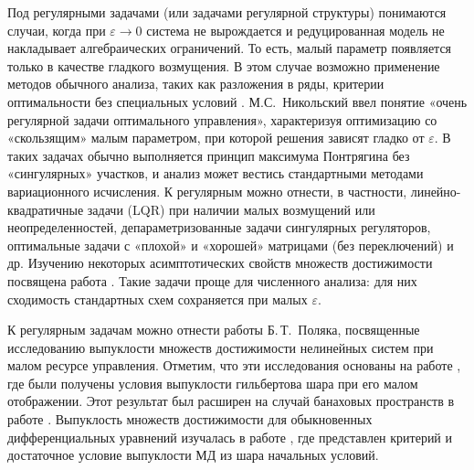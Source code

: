\documentclass[../main.tex]{subfiles}
\begin{document}
Под регулярными задачами (или задачами регулярной структуры) понимаются случаи, когда при $\varepsilon\to0$ система не вырождается и редуцированная модель не накладывает алгебраических ограничений. 
То есть, малый параметр появляется только в качестве гладкого возмущения. 
В этом случае возможно применение методов обычного анализа, таких как разложения в ряды, критерии оптимальности без специальных условий \cite{Haratishvili}. 
М.С. Никольский \cite{Nikolski} ввел понятие «очень регулярной задачи оптимального управления», характеризуя оптимизацию со «скользящим» малым параметром, при которой решения зависят гладко от $\varepsilon$. 
В таких задачах обычно выполняется принцип максимума Понтрягина без «сингулярных» участков, и анализ может вестись стандартными методами вариационного исчисления. 
К регулярным можно отнести, в частности, линейно-квадратичные задачи (LQR) при наличии малых возмущений или неопределенностей, депараметризованные задачи сингулярных регуляторов, оптимальные задачи с «плохой» и «хорошей» матрицами (без переключений) и др. 
Изучению некоторых асимптотических свойств множеств достижимости посвящена работа \cite{Chentsov}.
Такие задачи проще для численного анализа: для них сходимость стандартных схем сохраняется при малых $\varepsilon$.

К регулярным задачам можно отнести работы Б.\,Т.~Поляка, посвященные исследованию выпуклости множеств достижимости нелинейных систем при малом ресурсе управления.
Отметим, что эти исследования основаны на работе \cite{Polyak2001}, где были получены условия выпуклости гильбертова шара при его малом отображении. 
Этот результат был расширен на случай банаховых пространств в работе \cite{Ledyaev}.
Выпуклость множеств достижимости для обыкновенных дифференциальных уравнений изучалась в работе \cite{Reißig}, где представлен критерий и достаточное условие выпуклости МД из шара начальных условий.
\end{document}
